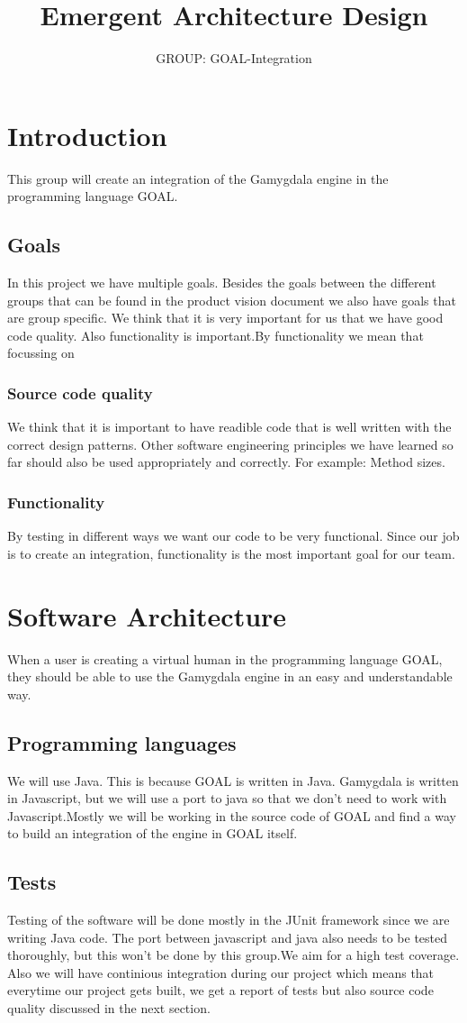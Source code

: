 \documentclass[]{article}
\title{Emergent Architecture Design}
\author{GROUP: GOAL-Integration}
\begin{document}
\section{Introduction}
This group will create an integration of the \gls{Gamygdala} engine in the programming language \gls{GOAL}.
\subsection{Goals}
In this project we have multiple goals. Besides the goals between the different groups that can be found in the product vision document we also have goals that are group specific. We think that it is very important for us that we have good code quality. Also functionality is important.By functionality we mean that focussing on

\subsubsection{Source code quality}
We think that it is important to have readible code that is well written with the correct design patterns. Other software engineering principles we have learned so far should also be used appropriately and correctly. For example: Method sizes.

\subsubsection{Functionality}
By testing in different ways we want our code to be very functional. Since our job is to create an integration, functionality is the most important goal for our team.


\section{Software Architecture}
When a user is creating a \gls{virtual human} in the programming language GOAL, they should be able to use the Gamygdala engine in an easy and understandable way.
\subsection{Programming languages}
We will use Java. This is because GOAL is written in Java.
Gamygdala is written in Javascript, but we will use a port to java so that we don't need to work with Javascript.Mostly we will be working in the source code of GOAL and find a way to build an integration of the engine in GOAL itself.
\subsection{Tests}
Testing of the software will be done mostly in the \gls{JUnit} framework since we are writing Java code. The port between javascript and java also needs to be tested thoroughly, but this won't be done by this group.We aim for a high test coverage. Also we will have continious integration during our project which means that everytime our project gets built, we get a report of tests but also source code quality discussed in the next section.
\end{document}
